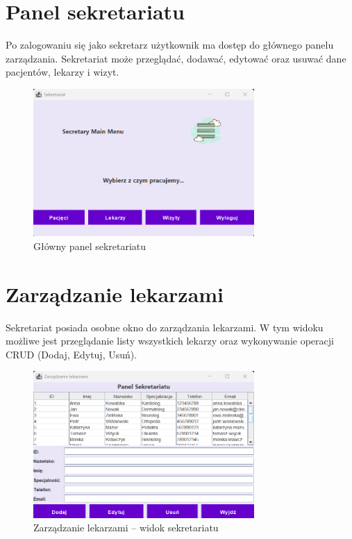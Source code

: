 \section{Panel sekretariatu}
Po zalogowaniu się jako sekretarz użytkownik ma dostęp do głównego panelu zarządzania. Sekretariat może przeglądać, dodawać, edytować oraz usuwać dane pacjentów, lekarzy i wizyt.

\begin{figure}[H]
\centering
\includegraphics[width=0.75\textwidth]{figures/secretary_main_menu.png}
\caption{Główny panel sekretariatu}
\end{figure}

\section{Zarządzanie lekarzami}
Sekretariat posiada osobne okno do zarządzania lekarzami. W tym widoku możliwe jest przeglądanie listy wszystkich lekarzy oraz wykonywanie operacji CRUD (Dodaj, Edytuj, Usuń).

\begin{figure}[H]
\centering
\includegraphics[width=0.75\textwidth]{figures/EditingDoctorsPanel.png}
\caption{Zarządzanie lekarzami – widok sekretariatu}
\end{figure}

